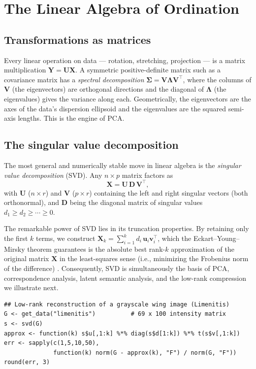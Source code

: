 \documentclass[11pt,oneside]{book}
\begin{document}
\chapter{The Linear Algebra of Ordination}
\label{ch:linalg}
\section{Transformations as matrices}
Every linear operation on data — rotation, stretching, projection — is a matrix
multiplication $\mathbf{Y}=\mathbf{U}\mathbf{X}$. A symmetric positive-definite matrix
such as a covariance matrix has a \emph{spectral decomposition}
$\mathbf{\Sigma}=\mathbf{V}\mathbf{\Lambda}\mathbf{V}^{\!\top}$, where the columns of
$\mathbf{V}$ (the eigenvectors) are orthogonal directions and the diagonal of
$\mathbf{\Lambda}$ (the eigenvalues) gives the variance along each. Geometrically, the
eigenvectors are the axes of the data's dispersion ellipsoid and the eigenvalues are
the squared semi-axis lengths. This is the engine of PCA.

\section{The singular value decomposition}
The most general and numerically stable move in linear algebra is the \emph{singular value decomposition}
(SVD). Any $n\times p$ matrix factors as
\[
  \mathbf{X}=\mathbf{U}\,\mathbf{D}\,\mathbf{V}^{\!\top},
\]
with $\mathbf{U}$ ($n\times r$) and $\mathbf{V}$ ($p\times r$) containing the left and right singular vectors (both orthonormal), and
$\mathbf{D}$ being the diagonal matrix of singular values $d_1\ge d_2\ge\cdots\ge 0$. 

The remarkable power of SVD lies in its truncation properties. By retaining only the first $k$ terms, we construct
$\mathbf{X}_k=\sum_{i=1}^{k} d_i\,\mathbf{u}_i\mathbf{v}_i^{\!\top}$, which the Eckart--Young--Mirsky theorem guarantees is the absolute best
rank-$k$ approximation of the original matrix $\mathbf{X}$ in the least-squares sense (i.e., minimizing the Frobenius norm of the difference) \cite{Eckart_1936}. Consequently, SVD is simultaneously
the basis of PCA, correspondence analysis, latent semantic analysis, and the low-rank
compression we illustrate next.

\begin{lstlisting}
## Low-rank reconstruction of a grayscale wing image (Limenitis)
G <- get_data("limenitis")          # 69 x 100 intensity matrix
s <- svd(G)
approx <- function(k) s$u[,1:k] %*% diag(s$d[1:k]) %*% t(s$v[,1:k])
err <- sapply(c(1,5,10,50),
              function(k) norm(G - approx(k), "F") / norm(G, "F"))
round(err, 3)
\end{lstlisting}
\end{document}
